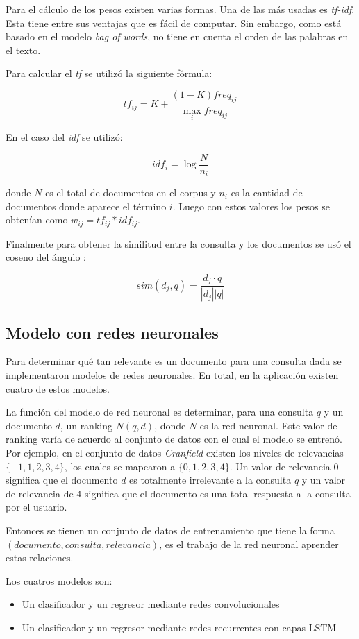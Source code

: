 \documentclass[12pt]{article}
\begin{document}
Para el cálculo de los pesos existen varias formas. Una de las más 
usadas es \textit{tf-idf}. Esta tiene entre sus ventajas que es 
fácil de computar. Sin embargo, como está basado en el modelo
\textit{bag of words}, no tiene en cuenta el orden de las palabras
en el texto.

Para calcular el \textit{tf} se utilizó la siguiente fórmula:

$$tf_{ij} = K + \frac{(1-K)freq_{ij}}{\max_{i} freq_{ij}}$$

En el caso del \textit{idf} se utilizó:

$$idf_i= \log \frac{N}{n_i}$$

donde $N$ es el total de documentos en el corpus y $n_i$ es la
cantidad de documentos donde aparece el término $i$. Luego con estos 
valores los pesos se obtenían como $w_{ij}= tf_{ij}*idf_{ij}$.

Finalmente para obtener la similitud entre la consulta y los 
documentos se usó el coseno del ángulo :

$$sim(d_{j},q) = \frac{ d_{j} \cdot q }{ |d_{j}||q| }$$


\subsection{Modelo con redes neuronales}

Para determinar qué tan relevante es un documento para una consulta dada se implementaron modelos de redes neuronales. En total, en la aplicación existen cuatro de estos modelos. 

La función del modelo de red neuronal es determinar, para una consulta $q$ y un documento $d$, un ranking $N(q,d)$, donde $N$ es la red neuronal. Este valor de ranking varía de acuerdo al conjunto de datos con el cual el modelo se entrenó. Por ejemplo, en el conjunto de datos \textit{Cranfield} existen los niveles de relevancias $\{-1,1,2,3,4\}$, los cuales se mapearon a $\{0,1,2,3,4\}$. Un valor de relevancia $0$ significa que el documento $d$ es totalmente irrelevante a la consulta $q$ y un valor de relevancia de $4$ significa que el documento es una total respuesta a la consulta por el usuario.

Entonces se tienen un conjunto de datos de entrenamiento que tiene la forma $(documento, consulta, relevancia)$, es el trabajo de la red neuronal aprender estas relaciones.

Los cuatros modelos son:
\begin{itemize}
	\item Un clasificador y un regresor mediante redes convolucionales
	\item Un clasificador y un regresor mediante redes recurrentes con capas LSTM
\end{itemize}
\end{document}
